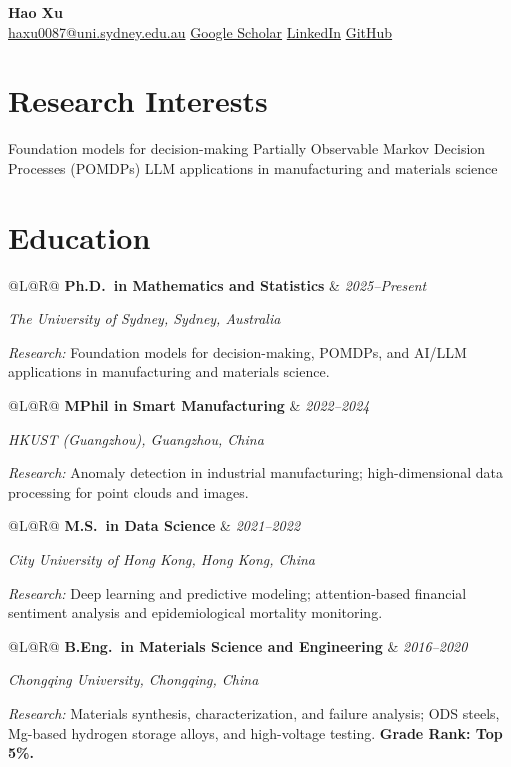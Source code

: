 \documentclass[11pt, a4paper]{article}
\makeatletter
\newcommand{\edentry}[4]{%
  \begin{tabularx}{\textwidth}{@{}L@{\hspace{6pt}}R@{}}
    \textbf{#1} & \textit{\small #2} \\
  \end{tabularx}\par
  \textit{\small #3}\par
  \vspace{1pt}
  {\small\textit{Research: }#4}
  \vspace{3pt}
}
\makeatother
\begin{document}

\begin{center}
  {\fontsize{22}{26}\selectfont\bfseries\color{navyblue} Hao Xu}\\[4pt]
  \small
  \href{mailto:haxu0087@uni.sydney.edu.au}{haxu0087@uni.sydney.edu.au}
  \enspace\textbullet\enspace
  \href{https://scholar.google.com/citations?hl=zh-CN&user=UT4pBpAAAAAJ&view_op=list_works&sortby=pubdate}{Google Scholar}
  \enspace\textbullet\enspace
  \href{https://www.linkedin.com/in/hao-xu-5a1201293}{LinkedIn}
  \enspace\textbullet\enspace
  \href{https://github.com/hao7748}{GitHub}
\end{center}

\section{Research Interests}

\small
Foundation models for decision-making \textbullet{} Partially Observable Markov Decision Processes (POMDPs) \textbullet{} LLM applications in manufacturing and materials science

\section{Education}

\edentry%
  {Ph.D.\ in Mathematics and Statistics}%
  {2025--Present}%
  {The University of Sydney, Sydney, Australia}%
  {Foundation models for decision-making, POMDPs, and AI/LLM applications
   in manufacturing and materials science.}

\edentry%
  {MPhil in Smart Manufacturing}%
  {2022--2024}%
  {HKUST (Guangzhou), Guangzhou, China}%
  {Anomaly detection in industrial manufacturing; high-dimensional data
   processing for point clouds and images.}

\edentry%
  {M.S.\ in Data Science}%
  {2021--2022}%
  {City University of Hong Kong, Hong Kong, China}%
  {Deep learning and predictive modeling; attention-based financial sentiment
   analysis and epidemiological mortality monitoring.}

\edentry%
  {B.Eng.\ in Materials Science and Engineering}%
  {2016--2020}%
  {Chongqing University, Chongqing, China}%
  {Materials synthesis, characterization, and failure analysis;
   ODS steels, Mg-based hydrogen storage alloys, and high-voltage testing.
   \textbf{Grade Rank: Top 5\%.}}
\end{document}
